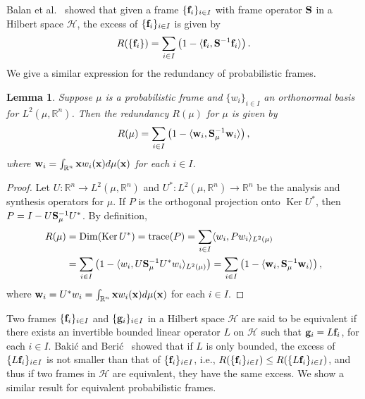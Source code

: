 \documentclass{amsart}
\numberwithin{equation}{section}
\DeclareMathOperator{\kernel}{Ker}
\DeclareMathOperator{\Dim}{Dim}
\DeclareMathOperator{\trace}{trace}
\theoremstyle{plain}
\newtheorem{lemma}[theorem]{Lemma}
\theoremstyle{remark}
\theoremstyle{definition}
\begin{document}
Balan et al.~\cite{balan2003deficits} showed that given a frame $\{{\bf f}_i\}_{i \in I}$ with frame operator $\bf S$ in a Hilbert space $\mathcal{H}$, the excess of $\{{\bf f}_i\}_{i \in I}$ is given by
$$R(\{{\bf f}_i\}) = \sum_{i \in I} \left( 1- \langle {\bf f}_i, {\bf S}^{-1}{\bf f}_i \rangle\right).$$
We give a similar expression for the redundancy of probabilistic frames.
\begin{lemma}
    Suppose $\mu$ is a probabilistic frame and $\{w_i\}_{i \in I}$ an orthonormal basis for $L^2(\mu, \mathbb{R}^n)$. Then the redundancy $R(\mu)$ for $\mu$ is given by
    \begin{equation*}
        R(\mu) = \sum_{i \in I} \left(1- \langle {\bf w}_i, {\bf S}_\mu^{-1}{\bf w}_i \rangle\right),
    \end{equation*}
    where  ${\bf w}_i = \int_{\mathbb{R}^n} {\bf x} w_i({\bf x})d\mu({\bf x})$ for each $i \in I$. 
\end{lemma}
\begin{proof}
    Let $U: \mathbb{R}^n \rightarrow L^2(\mu, \mathbb{R}^n)$ and $U^*:  L^2(\mu, \mathbb{R}^n) \rightarrow \mathbb{R}^n$ be the analysis and synthesis operators for $\mu$. If $P$ is the orthogonal projection onto $\kernel U^*$, then $P = I - U{\bf S}_\mu^{-1}U^*$.  By definition, 
    \begin{equation*}
        \begin{split}
            R(\mu) &= \Dim(\kernel U^*) = \trace (P) = \sum_{i \in I} \langle w_i, Pw_i \rangle_{L^2(\mu)}\\ 
            &= \sum_{i \in I} \left(1 - \langle w_i, U{\bf S}_\mu^{-1}U^*w_i \rangle_{L^2(\mu)} \right) 
            =\sum_{i \in I} \left(1- \langle {\bf w}_i, {\bf S}_\mu^{-1}{\bf w}_i \rangle\right),
        \end{split}
    \end{equation*}
 where ${\bf w}_i = U^*w_i = \int_{\mathbb{R}^n} {\bf x} w_i({\bf x})d\mu({\bf x})$ for each $i \in I$. 
\end{proof}

Two frames $\{{{\bf f}_i}\}_{i \in I}$ and $\{{{\bf g}_i}\}_{i \in I}$ in a Hilbert space $\mathcal{H}$ are said to be equivalent if there exists an invertible bounded linear operator $L$ on $\mathcal{H}$ such that ${\bf g}_i = L{\bf f}_{i}$, for each $i \in I$. Baki{\'c} and Beri{\'c}~\cite{bakic2015excesses} showed that if $L$ is only bounded, the excess of $\{{L{\bf f}_i}\}_{i \in I}$ is not smaller than that of $\{{{\bf f}_i}\}_{i \in I}$, i.e., $R(\{{{\bf f}_i}\}_{i \in I}) \leq  R(\{{L{\bf f}_i}\}_{i \in I})$, and thus if two frames in $\mathcal{H}$ are equivalent, they have the same excess. We show a similar result for equivalent probabilistic frames. 
\end{document}
